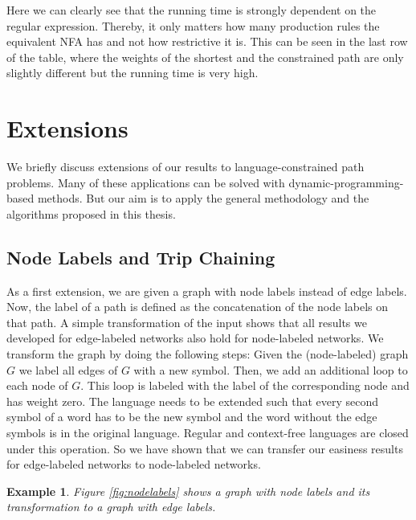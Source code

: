 \documentclass[]{article}
\newtheorem{example}[theorem]{Example}
\numberwithin{equation}{section}
\begin{document}
Here we can clearly see that the running time is strongly dependent on the regular expression. Thereby, it only matters how many production rules the equivalent NFA has and not how restrictive it is. This can be seen in the last row of the table, where the weights of the shortest and the constrained path are only slightly different but the running time is very high. 

\newpage

\section{Extensions}
\label{sec:ext}

We briefly discuss extensions of our results to language-constrained path problems. Many of these applications can be solved with dynamic-programming-based methods. But our aim is to apply the general methodology and the algorithms proposed in this thesis.\\

\subsection{Node Labels and Trip Chaining}

As a first extension, we are given a graph with node labels instead of edge labels. Now, the label of a path is defined as the concatenation of the node labels on that path. A simple transformation of the input shows that all results we developed for edge-labeled networks also hold for node-labeled networks. We transform the graph by doing the following steps: Given the (node-labeled) graph $G$ we label all edges of $G$ with a new symbol. Then, we add an additional loop to each node of $G$. This loop is labeled with the label of the corresponding node and has weight zero. The language needs to be extended such that every second symbol of a word has to be the new symbol and the word without the edge symbols is in the original language. Regular and context-free languages are closed under this operation. So we have shown that we can transfer our easiness results for edge-labeled networks to node-labeled networks.

\begin{example}
	Figure \ref{fig:nodelabels} shows a graph with node labels and its transformation to a graph with edge labels. 
\end{example}
\end{document}
